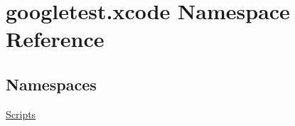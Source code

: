 \hypertarget{namespacegoogletest_1_1xcode}{}\section{googletest.\+xcode Namespace Reference}
\label{namespacegoogletest_1_1xcode}
\subsection*{Namespaces}
\begin{DoxyCompactItemize}
\item 
 \mbox{\hyperlink{namespacegoogletest_1_1xcode_1_1_scripts}{Scripts}}
\end{DoxyCompactItemize}
